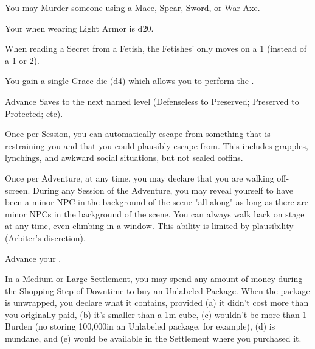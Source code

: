 \begin{multicols*}{2}

You may Murder someone using a Mace, Spear, Sword, or War Axe.


Your \MD when wearing Light Armor is d20.


When reading a Secret from a Fetish, the Fetishes' \UD only moves \DCDOWN on a 1 (instead of a 1 or 2).


You gain a single Grace die (d4) which allows you to perform the .


Advance  Saves to the next named level (Defenseless to Preserved; Preserved to Protected; etc).

\cbreak


Once per Session, you can automatically escape from something that is restraining you and that you could plausibly escape from. This includes grapples, lynchings, and awkward social situations, but not sealed coffins.


Once per Adventure, at any time, you may declare that you are walking off-screen. During any Session of the Adventure, you may reveal yourself to have been a minor NPC in the background of the scene "all along" as long as there are minor NPCs in the background of the scene. You can always walk back on stage at any time, even climbing in a window. This ability is limited by plausibility (Arbiter's discretion). 


Advance your  \DCUP.


In a Medium or Large Settlement, you may spend any amount of money during the Shopping Step of Downtime to buy an Unlabeled Package. When the package is unwrapped, you declare what it contains, provided (a) it didn't cost more than you originally paid, (b) it's smaller than a 1m cube, (c) wouldn't be more than 1 Burden  (no storing 100,000\AU in an Unlabeled package, for example), (d) is mundane, and (e) would be available in the Settlement where you purchased it.


\end{multicols*}
